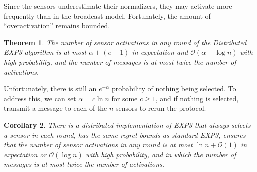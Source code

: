 \documentclass{sig-alternate-dan}
\numberwithin{equation}{section}
\newcommand{\algofont}[1]{\textsc{#1}}
\newcommand{\cO}{\mathcal{O}}
\newcommand{\EXPthree}{{\algofont{EXP3}}\xspace}
\newtheorem{theorem}{Theorem}
\newtheorem{cor}[theorem]{Corollary}
\begin{document}
Since the sensors underestimate their normalizers, they may activate more
frequently than in the broadcast model.   Fortunately, the amount of
``overactivation'' remains bounded.
%
\begin{theorem}\label{thm:dexp3-performance}
%
%
The number of sensor activations in any round of the Distributed \EXPthree algorithm 
is at most \mbox{$\alpha + (e-1)$} in
expectation and $\cO(\alpha + \log n)$ with high probability, and
the number of messages is at most twice the number of activations.
\end{theorem}

Unfortunately, there is still an $e^{-\alpha}$ probability of nothing
being selected.  To address this, we can set $\alpha = c\ln n$ for
some $c \ge 1$, and if 
%
nothing is selected, transmit a message to each of
the $n$ sensors to rerun the protocol.  

\begin{cor}\label{cor:dexp3-performance}
There is a distributed implementation of \EXPthree that always selects a
sensor in each round, has the same regret bounds as standard
\EXPthree, ensures that  
%
the number of sensor activations in any round is 
at most $\ln n + \cO(1)$ in expectation or $\cO(\log n)$ with high
probability, and in which the number of messages is at most twice the number of
activations.
\end{cor}
\end{document}
